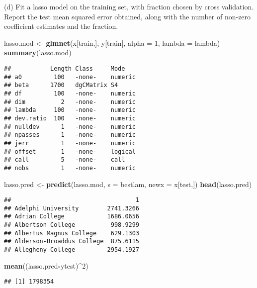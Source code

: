 \documentclass[
  ignorenonframetext,
]{beamer}
\newenvironment{Shaded}{\begin{snugshade}}{\end{snugshade}}
\newcommand{\DataTypeTok}[1]{\textcolor[rgb]{0.13,0.29,0.53}{#1}}
\newcommand{\DecValTok}[1]{\textcolor[rgb]{0.00,0.00,0.81}{#1}}
\newcommand{\KeywordTok}[1]{\textcolor[rgb]{0.13,0.29,0.53}{\textbf{#1}}}
\newcommand{\NormalTok}[1]{#1}
\newcommand{\OperatorTok}[1]{\textcolor[rgb]{0.81,0.36,0.00}{\textbf{#1}}}
\newcommand{\StringTok}[1]{\textcolor[rgb]{0.31,0.60,0.02}{#1}}
\begin{document}
\begin{frame}[fragile]{(d) Fit a lasso model on the training set, with
fraction chosen by cross validation. Report the test mean squared error
obtained, along with the number of non-zero coefficient estimates and
the fraction.}
\protect\hypertarget{d-fit-a-lasso-model-on-the-training-set-with-fraction-chosen-by-cross-validation.-report-the-test-mean-squared-error-obtained-along-with-the-number-of-non-zero-coefficient-estimates-and-the-fraction.}{}

\begin{Shaded}
\begin{Highlighting}[]
\NormalTok{lasso.mod <-}\StringTok{ }\KeywordTok{glmnet}\NormalTok{(x[train,], y[train], }\DataTypeTok{alpha =} \DecValTok{1}\NormalTok{, }\DataTypeTok{lambda =}\NormalTok{ lambda)}
\KeywordTok{summary}\NormalTok{(lasso.mod)}
\end{Highlighting}
\end{Shaded}

\begin{verbatim}
##           Length Class     Mode   
## a0         100   -none-    numeric
## beta      1700   dgCMatrix S4     
## df         100   -none-    numeric
## dim          2   -none-    numeric
## lambda     100   -none-    numeric
## dev.ratio  100   -none-    numeric
## nulldev      1   -none-    numeric
## npasses      1   -none-    numeric
## jerr         1   -none-    numeric
## offset       1   -none-    logical
## call         5   -none-    call   
## nobs         1   -none-    numeric
\end{verbatim}

\begin{Shaded}
\begin{Highlighting}[]
\NormalTok{lasso.pred <-}\StringTok{ }\KeywordTok{predict}\NormalTok{(lasso.mod, }\DataTypeTok{s =}\NormalTok{ bestlam, }\DataTypeTok{newx =}\NormalTok{ x[test,])}
\KeywordTok{head}\NormalTok{(lasso.pred)}
\end{Highlighting}
\end{Shaded}

\begin{verbatim}
##                                   1
## Adelphi University        2741.3266
## Adrian College            1686.0656
## Albertson College          998.9299
## Albertus Magnus College    629.1303
## Alderson-Broaddus College  875.6115
## Allegheny College         2954.1927
\end{verbatim}

\begin{Shaded}
\begin{Highlighting}[]
\KeywordTok{mean}\NormalTok{((lasso.pred}\OperatorTok{-}\NormalTok{ytest)}\OperatorTok{^}\DecValTok{2}\NormalTok{)}
\end{Highlighting}
\end{Shaded}

\begin{verbatim}
## [1] 1798354
\end{verbatim}

\end{frame}
\end{document}
